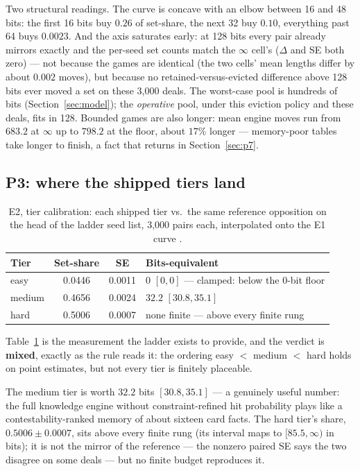 \documentclass[11pt]{article}
\begin{document}
Two structural readings. The curve is concave with an elbow between 16 and 48 bits:
the first 16 bits buy $0.26$ of set-share, the next 32 buy $0.10$, everything past 64
buys $0.0023$. And the axis saturates early: at 128 bits every pair already mirrors
exactly and the per-seed set counts match the $\infty$ cell's ($\Delta$ and SE both
zero) --- not because the games are identical (the two cells' mean lengths differ by
about $0.002$ moves), but because no retained-versus-evicted difference above 128 bits
ever moved a set on these 3{,}000 deals. The worst-case pool is hundreds of bits
(Section~\ref{sec:model}); the \emph{operative} pool, under this eviction policy and
these deals, fits in 128. Bounded games are also longer: mean engine moves run from
$683.2$ at $\infty$ up to $798.2$ at the floor, about $17\%$ longer --- memory-poor
tables take longer to finish, a fact that returns in Section~\ref{sec:p7}.

\subsection{P3: where the shipped tiers land}
\label{sec:tiers}

\begin{table}[t]
\centering
\caption{E2, tier calibration: each shipped tier vs.\ the same reference opposition on
the head of the ladder seed list, 3{,}000 pairs each, interpolated onto the E1 curve
\cite{artifact}.}
\label{tab:tiers}
\footnotesize
\begin{tabular}{@{}lccl@{}}
\toprule
Tier & Set-share & SE & Bits-equivalent \\
\midrule
easy   & 0.0446 & 0.0011 & 0 $[0, 0]$ --- clamped: below the 0-bit floor \\
medium & 0.4656 & 0.0024 & $32.2$ $[30.8, 35.1]$ \\
hard   & 0.5006 & 0.0007 & none finite --- above every finite rung \\
\bottomrule
\end{tabular}
\end{table}

Table~\ref{tab:tiers} is the measurement the ladder exists to provide, and the verdict
is \textbf{mixed}, exactly as the rule reads it: the ordering easy $<$ medium $<$ hard
holds on point estimates, but not every tier is finitely placeable.

The medium tier is worth $32.2$ bits $[30.8, 35.1]$ --- a genuinely useful number: the
full knowledge engine without constraint-refined hit probability plays like a
contestability-ranked memory of about sixteen card facts. The hard tier's share,
$0.5006 \pm 0.0007$, sits above every finite rung (its interval maps to
$[85.5, \infty)$ in bits); it is not the mirror of the reference --- the nonzero paired
SE says the two disagree on some deals --- but no finite budget reproduces it.
\end{document}
